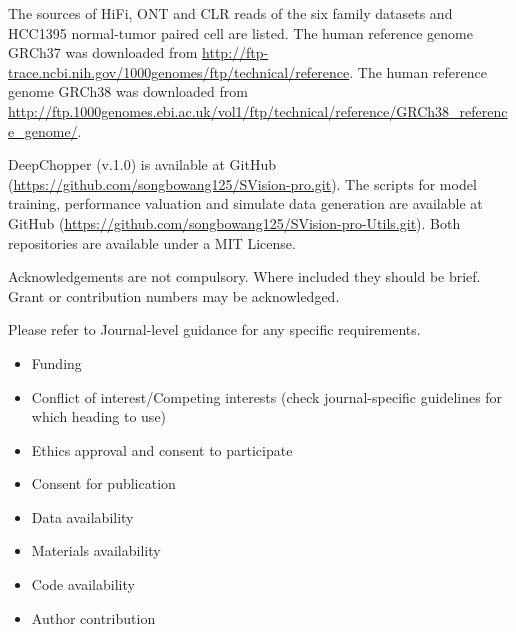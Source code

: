\documentclass[pdflatex, sn-mathphys-num, lineno]{sn-jnl}%
\theoremstyle{thmstyleone}%
\theoremstyle{thmstyletwo}%
\theoremstyle{thmstylethree}%
\begin{document}

The sources of HiFi, ONT and CLR reads of the six family datasets and HCC1395 normal-tumor paired cell are listed.
The human reference genome GRCh37 was downloaded from  \url{http://ftp-trace.ncbi.nih.gov/1000genomes/ftp/technical/reference}.
The human reference genome GRCh38 was downloaded from \url{http://ftp.1000genomes.ebi.ac.uk/vol1/ftp/technical/reference/GRCh38\_reference\_genome/}.



DeepChopper (v.1.0) is available at GitHub (\url{https://github.com/songbowang125/SVision-pro.git}).
The scripts for model training, performance valuation and simulate data generation are available at GitHub (\url{https://github.com/songbowang125/SVision-pro-Utils.git}).
Both repositories are available under a MIT License.



Acknowledgements are not compulsory. Where included they should be brief. Grant or contribution numbers may be acknowledged.

Please refer to Journal-level guidance for any specific requirements.



\begin{itemize}
	\item Funding
	\item Conflict of interest/Competing interests (check journal-specific guidelines for which heading to use)
	\item Ethics approval and consent to participate
	\item Consent for publication
	\item Data availability
	\item Materials availability
	\item Code availability
	\item Author contribution
\end{itemize}
\end{document}
